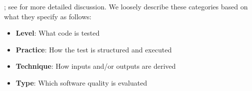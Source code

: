     ; see  for more detailed discussion\fi.
We loosely describe these categories based on what they specify
as follows:
\begin{itemize}
    \item \textbf{Level}: What code is tested
    \item \textbf{Practice}: How the test is structured and executed
    \item \textbf{Technique}: How inputs and/or outputs are derived
    \item \textbf{Type}: Which software quality is evaluated
\end{itemize}



